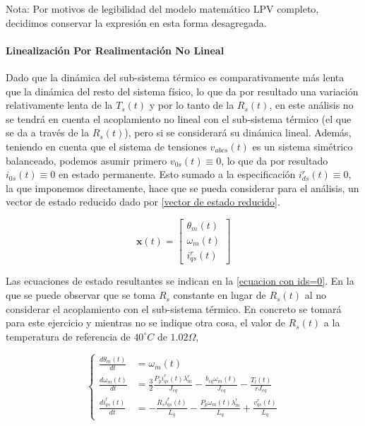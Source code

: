\documentclass[a4paper, 10pt, onecolumn,journal]{ieeeconf}
\begin{document}
Nota: Por motivos de legibilidad del modelo matemático LPV completo, decidimos conservar la expresión en esta forma desagregada.

\paragraph{\textbf{Linealización Por Realimentación No Lineal}}
Dado que la dinámica del sub-sistema térmico es comparativamente
más lenta que la dinámica del resto del sistema físico, lo que da por resultado
una variación relativamente lenta de la $T_s(t)$ y por lo tanto de la $R_s(t)$,
en este análisis no se tendrá en cuenta el acoplamiento no lineal con el sub-sistema térmico (el que se da a través de la $R_s(t)$), 
pero si se considerará su dinámica lineal. Además, teniendo en cuenta que el sistema de tensiones $v_{abcs}(t)$ es un sistema
simétrico balanceado, podemos asumir primero $v_{0s}(t) \equiv 0$, lo que da por resultado $i_{0s}(t) \equiv 0$ en estado permanente. Esto sumado a la especificación $i^{r}_{ds}(t)\equiv0$, 
la que imponemos directamente, hace que se pueda considerar para el análisis, un vector de estado reducido dado por \cref{vector de estado reducido}.

\begin{equation}
    \mathbf{x}(t) = \begin{bmatrix} \theta_m(t) \\ \omega_m(t) \\ i^r_{qs}(t)\end{bmatrix}
    \label{vector de estado reducido}
\end{equation}

Las ecuaciones de estado resultantes se indican en la \cref{ecuacion con ids=0}.
En la que se puede observar que se toma $R_s$ constante en lugar  de $R_s(t)$ al
no considerar el acoplamiento con el sub-sistema térmico. En concreto
se tomará para este ejercicio y mientras no se indique otra cosa, el valor de 
$R_s(t)$ a la temperatura de referencia de $40^\circ C$ de $1.02 \Omega$, \cite{c1}%

\begin{equation}
	\begin{cases}
		\frac{d \theta_m(t)}{dt}  &= {\omega}_m(t)\\
		\frac{d \omega_m(t)}{dt}  &= \frac{3}{2} \frac{P_p i^r_{qs}(t)\lambda^r_m}{J_{eq}} - \frac{b_{eq}\omega_m(t)}{J_{eq}} - \frac{T_l(t)}{r J_{eq}}\\
		\frac{d i^r_{qs}(t)}{dt}  &= -\frac{R_s i^r_{qs}(t)}{L_q} - \frac{P_p \omega_m(t) \lambda^r_m}{L_q}+ \frac{v^r_{qs}(t)}{L_q}
    \end{cases}
	\label{ecuacion con ids=0}
\end{equation}
\end{document}
